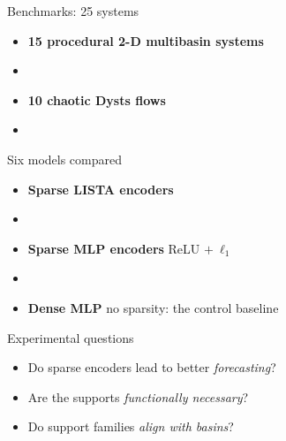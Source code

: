 \documentclass[aspectratio=169,10pt]{beamer}
\newcommand{\emphc}[1]{{\color{skaeorange}\bfseries #1}}
\newcommand{\emphp}[1]{{\color{skaepurple}\bfseries #1}}
\newcommand{\empht}[1]{{\color{skaeteal}\bfseries #1}}
\newenvironment{points}{\large\begin{itemize}\setlength{\itemsep}{0.85em}}{\end{itemize}}
\begin{document}
\begin{frame}{Benchmarks: 25 systems}
  \vfill
  \begin{points}
    \item \textbf{15 procedural 2-D multibasin systems}
    \item[] 
    \item \textbf{10 chaotic Dysts flows}
    \item[] 
  \end{points}
  \vfill
\end{frame}

\begin{frame}{Six models compared}
  \vfill
  \begin{points}
    \item \emphp{Sparse LISTA encoders}
    \item[] 
    \item \empht{Sparse MLP encoders} \hfill {\normalsize\color{skaegray} ReLU $+\ \ell_1$}
    \item[] 
    \item \emphc{Dense MLP} \hfill {\normalsize\color{skaegray} no sparsity: the control baseline}
  \end{points}
  \vfill
\end{frame}

\begin{frame}{Experimental questions}
  \vfill
  \begin{points}
    \item[\textbf{1.}] Do sparse encoders lead to better \emph{forecasting}?
    \item[\textbf{2.}] Are the supports \emph{functionally necessary}?
    \item[\textbf{3.}] Do support families \emph{align with basins}?
  \end{points}
  \vfill
\end{frame}
\end{document}
